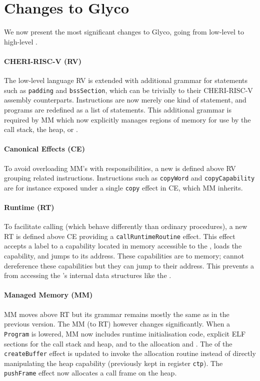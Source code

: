 \documentclass[main.tex]{subfiles}
\begin{document}
\section{Changes to Glyco} \label{sct:ghscc-changes}
We now present the most significant changes to Glyco, going from low-level to high-level .

\paragraph{CHERI-RISC-V (RV)} The low-level language RV is extended with additional grammar for statements such as \texttt{padding} and \texttt{bssSection}, which can be  trivially to their CHERI-RISC-V assembly counterparts. Instructions are now merely one kind of statement, and programs are redefined as a list of statements. This additional grammar is required by MM which now explicitly manages regions of memory for use by the call stack, the heap, or .

\paragraph{Canonical Effects (CE)} To avoid overloading MM's  with responsibilities, a new  is defined above RV grouping related instructions. Instructions such as \texttt{copyWord} and \texttt{copyCapability} are for instance exposed under a single \texttt{copy} effect in CE, which MM inherits.

\paragraph{Runtime (RT)} To facilitate calling  (which behave differently than ordinary procedures), a new  RT is defined above CE providing a \texttt{callRuntimeRoutine} effect. This effect accepts a label to a capability located in memory accessible to the , loads the capability, and jumps to its address. These capabilities are  to  memory;  cannot dereference these capabilities but they can jump to their address. This prevents a  from accessing the 's internal data structures like the .

\paragraph{Managed Memory (MM)} MM moves above RT but its grammar remains mostly the same as in the previous version. The MM (to RT)  however changes significantly. When a \texttt{Program} is lowered, MM now includes runtime initialisation code, explicit ELF sections for the call stack and heap, and  to the allocation and  . The  of the \texttt{createBuffer} effect is updated to invoke the allocation routine instead of directly manipulating the heap capability (previously kept in register \texttt{ctp}). The \texttt{pushFrame} effect now allocates a call frame on the heap.
\end{document}
